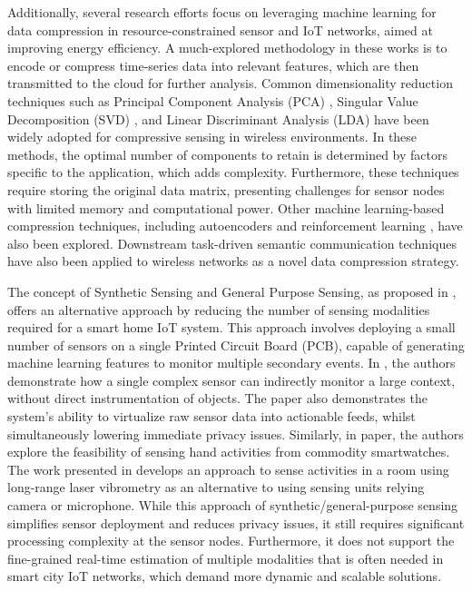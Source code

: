 Additionally, several research efforts focus on leveraging machine learning for data compression in resource-constrained sensor and IoT networks, aimed at improving energy efficiency. A much-explored methodology in these works is to encode or compress time-series data into relevant features, which are then transmitted to the cloud for further analysis. Common dimensionality reduction techniques such as Principal Component Analysis (PCA) \cite{chowdhury2020adaptive, yang2023guidelines, diwakaran2019cluster}, Singular Value Decomposition (SVD) \cite{alam2021error, he2019multi}, and Linear Discriminant Analysis (LDA) \cite{fabiyi2021folded} have been widely adopted for compressive sensing in wireless environments. In these methods, the optimal number of components to retain is determined by factors specific to the application, which adds complexity. Furthermore, these techniques require storing the original data matrix, presenting challenges for sensor nodes with limited memory and computational power. Other machine learning-based compression techniques, including autoencoders \cite{kuester2023convolutional, chen2020wsn} and reinforcement learning \cite{yun2021q}, have also been explored. Downstream task-driven semantic communication techniques \cite{feng2023data, wang2023semantic} have also been applied to wireless networks as a novel data compression strategy. 

The concept of Synthetic Sensing and General Purpose Sensing, as proposed in \cite{laput2017synthetic, laput2019sensing, zhang2018vibrosight}, offers an alternative approach by reducing the number of sensing modalities required for a smart home IoT system. This approach involves deploying a small number of sensors on a single Printed Circuit Board (PCB), capable of generating machine learning features to monitor multiple secondary events. In \cite{laput2017synthetic}, the authors demonstrate how a single complex sensor can indirectly monitor a large context, without direct instrumentation of objects. The paper also demonstrates the system's ability to virtualize raw sensor data into actionable feeds, whilst simultaneously lowering immediate privacy issues. Similarly, in paper\cite{laput2019sensing}, the authors explore the feasibility of sensing hand activities from commodity smartwatches. The work presented in \cite{zhang2018vibrosight} develops an approach to sense activities in a room using long-range laser vibrometry as an alternative to using sensing units relying camera or microphone. While this approach of synthetic/general-purpose sensing simplifies sensor deployment and reduces privacy issues, it still requires significant processing complexity at the sensor nodes. Furthermore, it does not support the fine-grained real-time estimation of multiple modalities that is often needed in smart city IoT networks, which demand more dynamic and scalable solutions.

